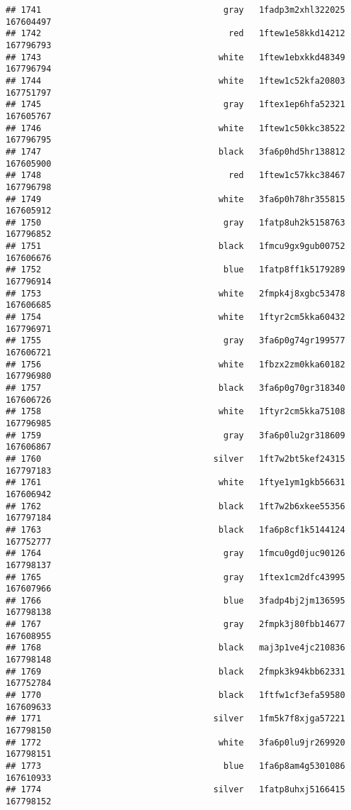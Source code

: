 \documentclass[
]{article}
\begin{document}
\begin{verbatim}
## 1741                                    gray   1fadp3m2xhl322025 167604497
## 1742                                     red   1ftew1e58kkd14212 167796793
## 1743                                   white   1ftew1ebxkkd48349 167796794
## 1744                                   white   1ftew1c52kfa20803 167751797
## 1745                                    gray   1ftex1ep6hfa52321 167605767
## 1746                                   white   1ftew1c50kkc38522 167796795
## 1747                                   black   3fa6p0hd5hr138812 167605900
## 1748                                     red   1ftew1c57kkc38467 167796798
## 1749                                   white   3fa6p0h78hr355815 167605912
## 1750                                    gray   1fatp8uh2k5158763 167796852
## 1751                                   black   1fmcu9gx9gub00752 167606676
## 1752                                    blue   1fatp8ff1k5179289 167796914
## 1753                                   white   2fmpk4j8xgbc53478 167606685
## 1754                                   white   1ftyr2cm5kka60432 167796971
## 1755                                    gray   3fa6p0g74gr199577 167606721
## 1756                                   white   1fbzx2zm0kka60182 167796980
## 1757                                   black   3fa6p0g70gr318340 167606726
## 1758                                   white   1ftyr2cm5kka75108 167796985
## 1759                                    gray   3fa6p0lu2gr318609 167606867
## 1760                                  silver   1ft7w2bt5kef24315 167797183
## 1761                                   white   1ftye1ym1gkb56631 167606942
## 1762                                   black   1ft7w2b6xkee55356 167797184
## 1763                                   black   1fa6p8cf1k5144124 167752777
## 1764                                    gray   1fmcu0gd0juc90126 167798137
## 1765                                    gray   1ftex1cm2dfc43995 167607966
## 1766                                    blue   3fadp4bj2jm136595 167798138
## 1767                                    gray   2fmpk3j80fbb14677 167608955
## 1768                                   black   maj3p1ve4jc210836 167798148
## 1769                                   black   2fmpk3k94kbb62331 167752784
## 1770                                   black   1ftfw1cf3efa59580 167609633
## 1771                                  silver   1fm5k7f8xjga57221 167798150
## 1772                                   white   3fa6p0lu9jr269920 167798151
## 1773                                    blue   1fa6p8am4g5301086 167610933
## 1774                                  silver   1fatp8uhxj5166415 167798152

\end{verbatim}
\end{document}
